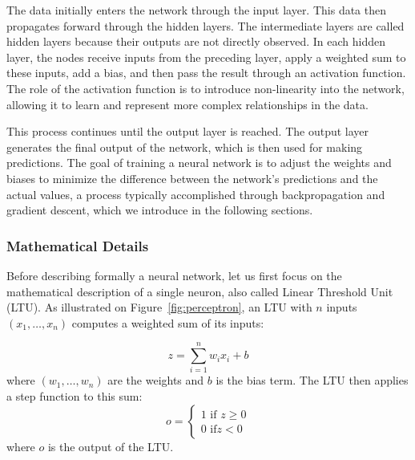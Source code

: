 The data initially enters the network through the input layer. This data then propagates forward through the hidden layers. The intermediate layers are called hidden layers because their outputs are not directly observed. In each hidden layer, the nodes receive inputs from the preceding layer, apply a weighted sum to these inputs, add a bias, and then pass the result through an activation function. The role of the activation function is to introduce non-linearity into the network, allowing it to learn and represent more complex relationships in the data.

This process continues until the output layer is reached. The output layer generates the final output of the network, which is then used for making predictions. The goal of training a neural network is to adjust the weights and biases to minimize the difference between the network's predictions and the actual values, a process typically accomplished through backpropagation and gradient descent, which we introduce in the following sections.



\subsubsection{Mathematical Details}
Before describing formally a neural network, let us first focus on the mathematical description of a single neuron, also called Linear Threshold Unit (LTU). As illustrated on Figure~\ref{fig:perceptron}, an LTU with $n$ inputs $(x_1, \dots, x_n)$ computes a weighted sum of its inputs:

\begin{equation}
    \label{eq:post-synaptic-pot}
    z = \sum_{i=1}^{n} w_i x_i + b
\end{equation}
where $(w_1, \dots, w_n)$ are the weights and $b$ is the bias term. The LTU then applies a step function to this sum:
\begin{equation}
    \label{eq:perceptron-io}
    o = 
    \begin{cases}
    1 \text{  if } z \geq 0 \\
    0 \text{  if}  z < 0
    \end{cases}
\end{equation}where $o$ is the output of the LTU.



